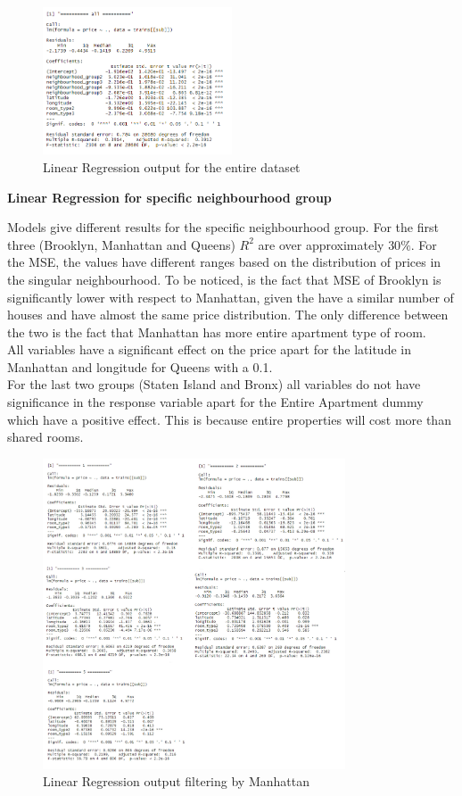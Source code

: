 \documentclass{FR16}
\begin{document}
\begin{figure}[H]
\centering
\includegraphics[width=0.5\textwidth]{figures/lm1.PNG} 
\caption{\label{fig:6} Linear Regression output for the entire dataset}
\end{figure}
\newpage
\noindent \textbf{Linear Regression for specific neighbourhood group}

\noindent Models give different results for the specific neighbourhood group. For the first three (Brooklyn, Manhattan and Queens) $R^2$ are over approximately $30\%$. For the MSE, the values have different ranges based on the distribution of prices in the singular neighbourhood. To be noticed, is the fact that MSE of Brooklyn is significantly lower with respect to Manhattan, given the have a similar number of houses and have almost the same price distribution. The only difference between the two is the fact that Manhattan has more entire apartment type of room. 
\\ All variables have a significant effect on the price apart for the latitude in Manhattan and longitude for Queens with a 0.1.  \\
For the last two groups (Staten Island and Bronx) all variables do not have significance in the response variable apart for the Entire Apartment dummy which have a positive effect. This is because entire properties will cost more than shared rooms.
\begin{figure}[H]
\centering
\includegraphics[width=0.8\textwidth]{figures/lm2.jpg} 
\caption{\label{fig:6}  Linear Regression output filtering by  Manhattan}
\end{figure}
\end{document}
